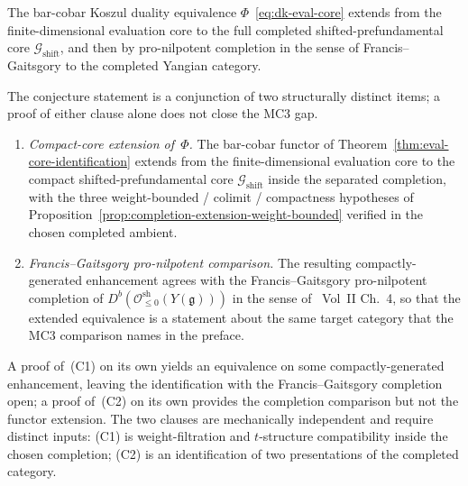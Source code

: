 \begin{conjecture}
\label{conj:dk-compacts-completion}
The bar-cobar Koszul duality equivalence
$\Phi$~\eqref{eq:dk-eval-core} extends from the finite-dimensional
evaluation core to the full completed shifted-prefundamental core
$\mathcal{G}_{\mathrm{shift}}$, and then by pro-nilpotent completion
in the sense of Francis--Gaitsgory to the completed Yangian category.
\end{conjecture}

\begin{remark}
\label{rem:dk-compacts-completion-two-clause}
%
The conjecture statement is a conjunction of two structurally distinct
items; a proof of either clause alone does not close the MC3 gap.
\begin{enumerate}[label=\textup{(C\arabic*)},nosep]
\item \emph{Compact-core extension of~$\Phi$.} The bar-cobar functor
 of Theorem~\ref{thm:eval-core-identification} extends from the
 finite-dimensional evaluation core to the compact
 shifted-prefundamental core $\mathcal{G}_{\mathrm{shift}}$ inside
 the separated completion, with the three weight-bounded / colimit /
 compactness hypotheses of
 Proposition~\ref{prop:completion-extension-weight-bounded}
 verified in the chosen completed ambient.
\item \emph{Francis--Gaitsgory pro-nilpotent comparison.} The
 resulting compactly-generated enhancement agrees with the
 Francis--Gaitsgory pro-nilpotent completion of
 $D^b(\mathcal{O}^{\mathrm{sh}}_{\leq 0}(Y(\mathfrak{g})))$ in the
 sense of~\cite{GR17} Vol~II Ch.~4, so that the extended equivalence
 is a statement about the same target category that the MC3 comparison
names in the preface.
\end{enumerate}
A proof of~(C1) on its own yields an equivalence on some
compactly-generated enhancement, leaving the identification with the
Francis--Gaitsgory completion open; a proof of~(C2) on its own
provides the completion comparison but not the functor extension. The
two clauses are mechanically independent and require distinct inputs:
(C1) is weight-filtration and $t$-structure compatibility inside the
chosen completion; (C2) is an identification of two presentations of
the completed category.
\end{remark}

